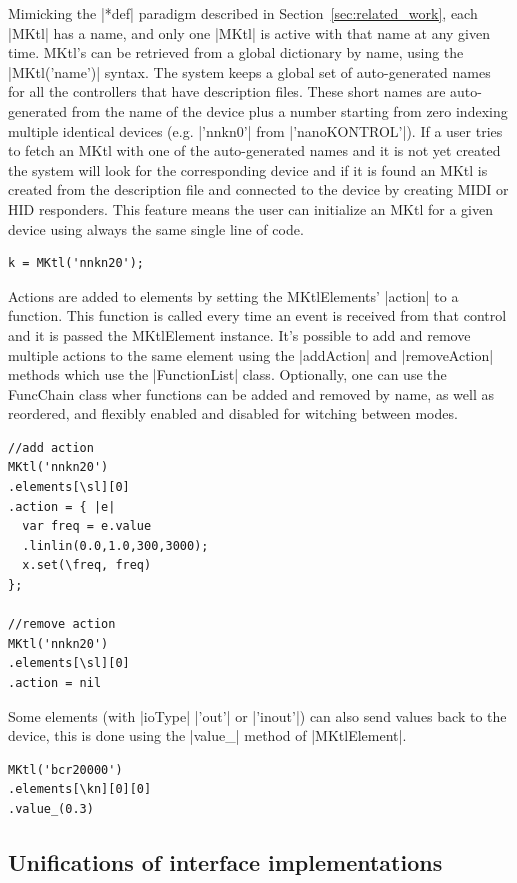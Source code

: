 \documentclass{article}
\begin{document}
Mimicking the |*def| paradigm described in Section~\ref{sec:related_work}, each |MKtl| has a name, and only one |MKtl| is active with that name at any given time. 
MKtl's can be retrieved from a global dictionary by name, using the |MKtl('name')| syntax. 
The system keeps a global set of auto-generated names for all the controllers that have description files. These short names are auto-generated from the name of the device plus a number starting from zero indexing multiple identical devices (e.g. |'nnkn0'| from |'nanoKONTROL'|). If a user tries to fetch an MKtl with one of the auto-generated names and it is not yet created the system will look for the corresponding device and if it is found an MKtl is created from the description file and connected to the device by creating MIDI or HID responders. This feature means the user can initialize an MKtl for a given device using always the same single line of code.

\begin{Verbatim}
k = MKtl('nnkn20');
\end{Verbatim}

Actions are added to elements by setting the MKtlElements' |action| to a function. This function is called every time an event is received from that control and it is passed the MKtlElement instance. It's possible to add and remove multiple actions to the same element using the |addAction| and |removeAction| methods which use the |FunctionList| class. Optionally, one can use the FuncChain class wher functions can be added and removed by name, as well as reordered, and flexibly enabled and disabled for witching between modes. 

\begin{Verbatim}
//add action
MKtl('nnkn20')
.elements[\sl][0]
.action = { |e|
  var freq = e.value
  .linlin(0.0,1.0,300,3000);
  x.set(\freq, freq)
};

//remove action
MKtl('nnkn20')
.elements[\sl][0]
.action = nil
\end{Verbatim}

Some elements (with |ioType| |'out'| or |'inout'|) can also send values back to the device, this is done using the |value_| method of |MKtlElement|.

\begin{Verbatim}	
MKtl('bcr20000')
.elements[\kn][0][0]
.value_(0.3)
\end{Verbatim}

\subsection{Unifications of interface implementations}
\label{sub:unifications_of_interface_implementations}
\end{document}
